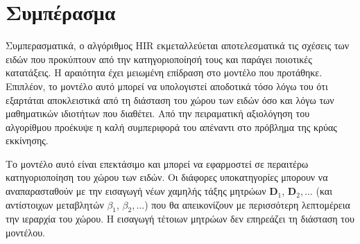 \section{Συμπέρασμα}
Συμπερασματικά, ο αλγόριθμος {\en HIR} εκμεταλλεύεται αποτελεσματικά τις σχέ\-σεις των ειδών που προκύπτουν από την κατηγοριοποίησή τους και παράγει ποιοτικές κατατάξεις. Η αραιότητα έχει μειωμένη επίδραση στο μοντέλο που προτάθηκε. Επιπλέον, το μοντέλο αυτό μπορεί να υπολογιστεί αποδοτικά τόσο λόγω του ότι εξαρτάται αποκλειστικά από τη διάσταση του χώρου των ειδών όσο και λόγω των μαθηματικών ιδιοτήτων που διαθέτει. Από την πειραματική αξιολόγηση του αλγορίθμου προέκυψε η καλή συμπεριφορά του απέναντι στο πρόβλημα της κρύας εκκίνησης. \par
Το μοντέλο αυτό είναι επεκτάσιμο και μπορεί να εφαρμοστεί σε περαιτέρω κατηγοριοποίηση του χώρου των ειδών. Οι διάφορες υποκατηγορίες μπορουν να αναπαρασταθούν με την εισαγωγή νέων χαμηλής τάξης μητρώων $\mathbf{D}_1$, $\mathbf{D}_2, \dots$ (και αντίστοιχων μεταβλητών $\beta_1$, $\beta_2, \dots$) που θα απεικονίζουν με περισσότερη λεπτομέρεια την ιεραρχία του χώρου. Η εισαγωγή τέτοιων μητρώων δεν επηρεάζει τη διάσταση του μοντέλου. 